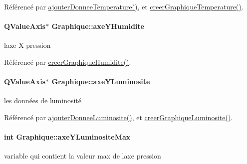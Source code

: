 Référencé par \hyperlink{class_graphique_a42b3c986ca86c426adbb8fdb03a04380}{ajouter\+Donnee\+Temperature()}, et \hyperlink{class_graphique_ad9b976804bafcbfe451d89fd35729d16}{creer\+Graphique\+Temperature()}.

\paragraph[{\texorpdfstring{axe\+Y\+Humidite}{axeYHumidite}}]{\setlength{\rightskip}{0pt plus 5cm}Q\+Value\+Axis$\ast$ Graphique\+::axe\+Y\+Humidite\hspace{0.3cm}{\ttfamily [private]}}\hypertarget{class_graphique_af87e1bc5874f5d633ed944205c8ba15e}{}\label{class_graphique_af87e1bc5874f5d633ed944205c8ba15e}
l\textquotesingle{}axe X pression 

Référencé par \hyperlink{class_graphique_a19d6deef2d11e95093a343d49f75d14e}{creer\+Graphique\+Humidite()}.

\paragraph[{\texorpdfstring{axe\+Y\+Luminosite}{axeYLuminosite}}]{\setlength{\rightskip}{0pt plus 5cm}Q\+Value\+Axis$\ast$ Graphique\+::axe\+Y\+Luminosite\hspace{0.3cm}{\ttfamily [private]}}\hypertarget{class_graphique_a275865e638fd7cb5183d29d8b1a3624e}{}\label{class_graphique_a275865e638fd7cb5183d29d8b1a3624e}
les données de luminosité 

Référencé par \hyperlink{class_graphique_a1af0e1968998cb7b5ee8add1197cb0e0}{ajouter\+Donnee\+Luminosite()}, et \hyperlink{class_graphique_a3b55b9c4732856e1b25bef167c25ac4c}{creer\+Graphique\+Luminosite()}.

\paragraph[{\texorpdfstring{axe\+Y\+Luminosite\+Max}{axeYLuminositeMax}}]{\setlength{\rightskip}{0pt plus 5cm}int Graphique\+::axe\+Y\+Luminosite\+Max\hspace{0.3cm}{\ttfamily [private]}}\hypertarget{class_graphique_ac8e0364a45fe0882d175f12da7f9b1b3}{}\label{class_graphique_ac8e0364a45fe0882d175f12da7f9b1b3}
variable qui contient la valeur max de l\textquotesingle{}axe pression 

